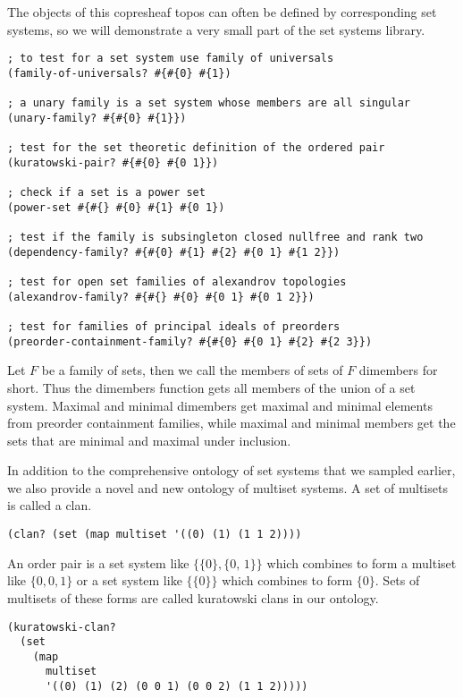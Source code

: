 \documentclass[a4paper,11pt]{report}
\begin{document}
The objects of this copresheaf topos can often be defined by corresponding set systems, so we will demonstrate a very small part of the set systems library. 

\begin{lstlisting}
; to test for a set system use family of universals
(family-of-universals? #{#{0} #{1})

; a unary family is a set system whose members are all singular
(unary-family? #{#{0} #{1}})

; test for the set theoretic definition of the ordered pair
(kuratowski-pair? #{#{0} #{0 1}})

; check if a set is a power set
(power-set #{#{} #{0} #{1} #{0 1})

; test if the family is subsingleton closed nullfree and rank two
(dependency-family? #{#{0} #{1} #{2} #{0 1} #{1 2}})

; test for open set families of alexandrov topologies
(alexandrov-family? #{#{} #{0} #{0 1} #{0 1 2}})

; test for families of principal ideals of preorders
(preorder-containment-family? #{#{0} #{0 1} #{2} #{2 3}})
\end{lstlisting}

Let $F$ be a family of sets, then we call the members of sets of $F$ dimembers for short. Thus the dimembers function gets all members of the union of a set system. Maximal and minimal dimembers get maximal and minimal elements from preorder containment families, while maximal and minimal members get the sets that are minimal and maximal under inclusion.

\newpage 

In addition to the comprehensive ontology of set systems that we sampled earlier, we also provide a novel and new ontology of multiset systems. A set of multisets is called a clan.

\begin{lstlisting}
(clan? (set (map multiset '((0) (1) (1 1 2))))
\end{lstlisting}

An order pair is a set system like $\{\{0\},\{0, \, 1\}\}$ which combines to form a multiset like $\{0,0,1\}$ or a set system like $\{\{0\}\}$ which combines to form $\{0\}$. Sets of multisets of these forms are called kuratowski clans in our ontology.

\begin{lstlisting}
(kuratowski-clan?
  (set 
    (map 
      multiset 
      '((0) (1) (2) (0 0 1) (0 0 2) (1 1 2)))))
\end{lstlisting}
\end{document}
